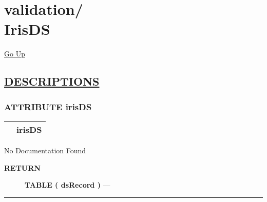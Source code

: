 \chapter*{\color{headfile}
{\large validation\slash\hspace{0pt}}
 \\
IrisDS
}
\hypertarget{ecldoc:toc:validation.IrisDS}{}
\hyperlink{ecldoc:toc:root/validation}{Go Up}


\section*{\underline{\textsf{DESCRIPTIONS}}}
\subsection*{\textsf{\colorbox{headtoc}{\color{white} ATTRIBUTE}
irisDS}}

\hypertarget{ecldoc:validation.irisds}{}

{\renewcommand{\arraystretch}{1.5}
\begin{tabularx}{\textwidth}{|>{\raggedright\arraybackslash}l|X|}
\hline
\hspace{0pt}\mytexttt{\color{red} } & \textbf{irisDS} \\
\hline
\end{tabularx}
}

\par





No Documentation Found








\par
\begin{description}
\item [\colorbox{tagtype}{\color{white} \textbf{\textsf{RETURN}}}] \textbf{TABLE ( dsRecord )} --- 
\end{description}




\rule{\linewidth}{0.5pt}

